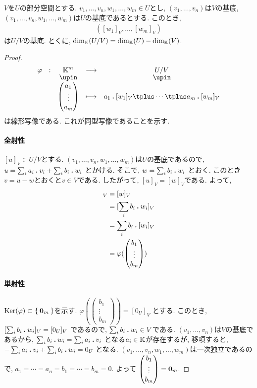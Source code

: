 \begin{theorem}
  \label{thm:dim:quotient}
  $V$を$U$の部分空間とする.
  $v_1,\ldots, v_n,w_1,\ldots,w_m\in U$とし,
  $(v_1,\ldots, v_n)$は$V$の基底,
  $(v_1,\ldots, v_n,w_1,\ldots, w_m)$は$U$の基底であるとする.
  このとき,
  \begin{align*}
    ([w_1]_V,\ldots, [w_m]_V)
  \end{align*}
  は$U/V$の基底.
  とくに, $\dim_{\mathbb{K}}(U/V)=\dim_{\mathbb{K}}(U)-\dim_{\mathbb{K}}(V)$.
\end{theorem}
\begin{proof}
  \begin{align*}
    \shazo{\varphi}{\KK^m}{U/V}
          {\begin{pmatrix}a_1\\\vdots\\a_m\end{pmatrix}}
          {a_1\act [w_1]_V\plus \cdots \plus a_m\act [w_m]_V}
  \end{align*}
  は線形写像である.
  これが同型写像であることを示す.
  \paragraph{全射性}
  $[u]_V\in U/V$とする.
  $(v_1,\ldots, v_n,w_1,\ldots, w_m)$は$U$の基底であるので,
  $u=\sum_{i}a_i\mathbin{\boldsymbol{.}} v_i+\sum_{i}b_i \mathbin{\boldsymbol{.}} w_i$
  とかける.
  そこで,
  $w=\sum_{i}b_i \mathbin{\boldsymbol{.}} w_i$
  とおく.
  このとき$v=u-w$とおくと$v\in V$である.
  したがって, $[u]_V=[w]_V$である.
  よって,
  \begin{align*}
    [u]_V
    &=[w]_V\\
    &=[\sum_{i}b_i \act w_i]_V\\
    &=\sum_{i}b_i \act[ w_i]_V\\
    &=\varphi(\begin{pmatrix}b_1\\\vdots\\b_m\end{pmatrix})\\
  \end{align*}
  \paragraph{単射性}
  $\operatorname{Ker}(\varphi)\subset\Set{\boldsymbol{0}_m}$を示す.
  $\varphi(\begin{pmatrix}b_1\\\vdots\\b_m\end{pmatrix})=[0_U]_V$
  とする.
  このとき,
  $[\sum_{i}b_i \mathbin{\boldsymbol{.}} w_i]_V=[0_U]_V$
  であるので, $\sum_{i}b_i \mathbin{\boldsymbol{.}} w_i\in V$である.
  $(v_1,\ldots, v_n)$は$V$の基底であるから,
  $\sum_{i}b_i \mathbin{\boldsymbol{.}} w_i=\sum_{i}a_i\mathbin{\boldsymbol{.}} v_i$
  となる$a_i\in \mathbb{K}$が存在するが,
  移項すると,
  $-\sum_{i}a_i\mathbin{\boldsymbol{.}} v_i+\sum_{i}b_i \mathbin{\boldsymbol{.}} w_i=0_U$
  となる.
  $(v_1,\ldots, v_n,w_1,\ldots, w_m)$は一次独立であるので,
  $a_1=\cdots=a_n=b_1=\cdots=b_m=0$.
  よって
  $\begin{pmatrix}b_1\\\vdots\\b_m\end{pmatrix}=\boldsymbol{0}_m$.
\end{proof}

